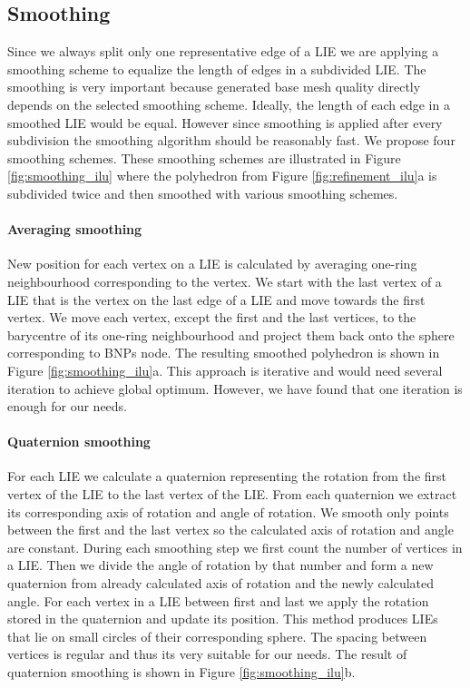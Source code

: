 \subsection{Smoothing}
Since we always split only one representative edge of a LIE we are applying a smoothing scheme to equalize the length of edges in a subdivided LIE. The smoothing is very important because generated base mesh quality directly depends on the selected smoothing scheme. Ideally, the length of each edge in a smoothed LIE would be equal. However since smoothing is applied after every subdivision the smoothing algorithm should be reasonably fast. We propose four smoothing schemes. These smoothing schemes are illustrated in Figure \ref{fig:smoothing_ilu} where the polyhedron from Figure \ref{fig:refinement_ilu}a is subdivided twice and then smoothed with various smoothing schemes.

\paragraph{Averaging smoothing}
New position for each vertex on a LIE is calculated by averaging one-ring neighbourhood corresponding to the vertex. We start with the last vertex of a LIE that is the vertex on the last edge of a LIE and move towards the first vertex. We move each vertex, except the first and the last vertices, to the barycentre of its one-ring neighbourhood and project them back onto the sphere corresponding to BNPs node. The resulting smoothed polyhedron is shown in Figure \ref{fig:smoothing_ilu}a. This approach is iterative and would need several iteration to achieve global optimum. However, we have found that one iteration is enough for our needs.

\paragraph{Quaternion smoothing}
For each LIE we calculate a quaternion representing the rotation from the first vertex of the LIE to the last vertex of the LIE. From each quaternion we extract its corresponding axis of rotation and angle of rotation. We smooth only points between the first and the last vertex so the calculated axis of rotation and angle are constant. During each smoothing step we first count the number of vertices in a LIE. Then we divide the angle of rotation by that number and form a new quaternion from already calculated axis of rotation and the newly calculated angle. For each vertex in a LIE between first and last we apply the rotation stored in the quaternion and update its position. This method produces LIEs that lie on small circles of their corresponding sphere. The spacing between vertices is regular and thus its very suitable for our needs. The result of quaternion smoothing is shown in Figure \ref{fig:smoothing_ilu}b.

